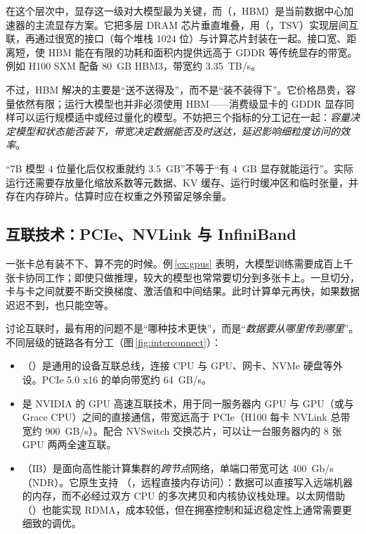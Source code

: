 

在这个层次中，显存这一级对大模型最为关键，而（，HBM）是当前数据中心加速器的主流显存方案。它把多层 DRAM 芯片垂直堆叠，用（，TSV）实现层间互联，再通过很宽的接口（每个堆栈 1024 位）与计算芯片封装在一起。接口宽、距离短，使 HBM 能在有限的功耗和面积内提供远高于 GDDR 等传统显存的带宽。例如 H100 SXM 配备 \SI{80}{GB} HBM3，带宽约 \SI{3.35}{TB/s}\cite{nvidia2023h100}。

不过，HBM 解决的主要是“送不送得及”，而不是“装不装得下”。它价格昂贵，容量依然有限；运行大模型也并非必须使用 HBM——消费级显卡的 GDDR 显存同样可以运行规模适中或经过量化的模型。不妨把三个指标的分工记在一起：\emph{容量决定模型和状态能否装下，带宽决定数据能否及时送达，延迟影响细粒度访问的效率}。

\begin{pitfall}
“7B 模型 4 位量化后仅权重就约 \SI{3.5}{GB}”不等于“有 \SI{4}{GB} 显存就能运行”。实际运行还需要存放量化缩放系数等元数据、KV 缓存、运行时缓冲区和临时张量，并存在内存碎片。估算时应在权重之外预留足够余量。
\end{pitfall}

\subsection{互联技术：PCIe、NVLink 与 InfiniBand}
\label{subsec:interconnect}

一张卡总有装不下、算不完的时候。例\,\ref{ex:gpus} 表明，大模型训练需要成百上千张卡协同工作；即使只做推理，较大的模型也常常要切分到多张卡上。一旦切分，卡与卡之间就要不断交换梯度、激活值和中间结果。此时计算单元再快，如果数据迟迟不到，也只能空等。

讨论互联时，最有用的问题不是“哪种技术更快”，而是“\emph{数据要从哪里传到哪里}”。不同层级的链路各有分工（图\,\ref{fig:interconnect}）：
\begin{itemize}
  \item {}（）是通用的设备互联总线，连接 CPU 与 GPU、网卡、NVMe 硬盘等外设。PCIe 5.0 x16 的单向带宽约 \SI{64}{GB/s}。
  \item {} 是 NVIDIA 的 GPU 高速互联技术，用于同一服务器内 GPU 与 GPU（或与 Grace CPU）之间的直接通信，带宽远高于 PCIe（H100 每卡 NVLink 总带宽约 \SI{900}{GB/s}\cite{nvidia2023h100}）。配合 NVSwitch 交换芯片，可以让一台服务器内的 8 张 GPU 两两全速互联。
  \item {}（IB）是面向高性能计算集群的\emph{跨节点}网络，单端口带宽可达 \SI{400}{Gb/s}（NDR）。它原生支持 （，远程直接内存访问）：数据可以直接写入远端机器的内存，而不必经过双方 CPU 的多次拷贝和内核协议栈处理。以太网借助 （）也能实现 RDMA，成本较低，但在拥塞控制和延迟稳定性上通常需要更细致的调优。
\end{itemize}

